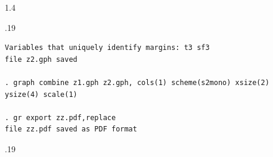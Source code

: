 \documentclass[10pt, letterpaper]{article}
\begin{document}
\begin{spacing}{1.4}
\begin{scriptsize}
\begin{spacing}{.19}
\begin{verbatim}
Variables that uniquely identify margins: t3 sf3
file z2.gph saved

. graph combine z1.gph z2.gph, cols(1) scheme(s2mono) xsize(2) ysize(4) scale(1)

. gr export zz.pdf,replace
file zz.pdf saved as PDF format
\end{verbatim}
\end{spacing}{.19}
\end{scriptsize}



\end{spacing}
\end{document}
